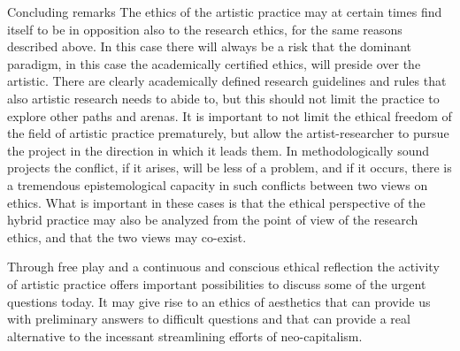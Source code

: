 \documentclass[presentation]{beamer}
\begin{document}
\begin{frame}[label={sec:org0a23741}]{Concluding remarks}
The ethics of the artistic practice may at certain times find itself to be in opposition also to the research ethics, for the same reasons described above. In this case there will always be a risk that the dominant paradigm, in this case the academically certified ethics, will preside over the artistic. There are clearly academically defined research guidelines and rules that also artistic research needs to abide to, but this should not limit the practice to explore other paths and arenas. It is important to not limit the ethical freedom of the field of artistic practice prematurely, but allow the artist-researcher to pursue the project in the direction in which it leads them. In methodologically sound projects the conflict, if it arises, will be less of a problem, and if it occurs, there is a tremendous epistemological capacity in such conflicts between two views on ethics. What is important in these cases is that the ethical perspective of the hybrid practice may also be analyzed from the point of view of the research ethics, and that the two views may co-exist.

Through free play and a continuous and conscious ethical reflection the activity of artistic practice offers important possibilities to discuss some of the urgent questions today. It may give rise to an ethics of aesthetics that can provide us with preliminary answers to difficult questions and that can provide a real alternative to the incessant streamlining efforts of neo-capitalism.
\end{frame}
\end{document}
